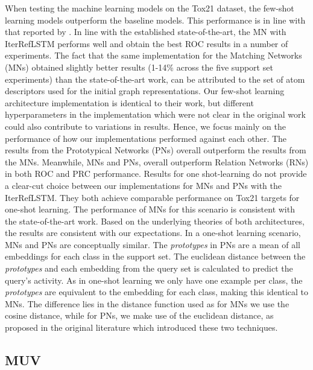 \documentclass[journal=acscii,manuscript=article]{achemso}
\begin{document}
When testing the machine learning models on the Tox21 dataset, the few-shot learning models outperform the baseline models. This performance is in line with that reported by \citet{altae2017low}. In line with the established state-of-the-art, the MN with IterRefLSTM performs well and obtain the best ROC results in a number of experiments. The fact that the same implementation for the Matching Networks (MNs) obtained slightly better results (1-14\% across the five support set experiments) than the state-of-the-art work, can be attributed to the set of atom descriptors used for the initial graph representations. Our few-shot learning architecture implementation is identical to their work, but different hyperparameters in the implementation which were not clear in the original work could also contribute to variations in results. Hence, we focus mainly on the performance of how our implementations performed against each other. The results from the Prototypical Networks (PNs) overall outperform the results from the MNs. Meanwhile, MNs and PNs, overall outperform Relation Networks (RNs) in both ROC and PRC performance. Results for one shot-learning do not provide a clear-cut choice between our implementations for MNs and PNs with the IterRefLSTM. They both achieve comparable performance on Tox21 targets for one-shot learning. The performance of MNs for this scenario is consistent with the state-of-the-art work. Based on the underlying theories of both architectures, the results are consistent with our expectations. In a one-shot learning scenario, MNs and PNs are conceptually similar. The \textit{prototypes} in PNs are a mean of all embeddings for each class in the support set. The euclidean distance between the \textit{prototypes} and each embedding from the query set is calculated to predict the query's activity. As in one-shot learning we only have one example per class, the \textit{prototypes} are equivalent to the embedding for each class, making this identical to MNs. The difference lies in the distance function used as for MNs we use the cosine distance, while for PNs, we make use of the euclidean distance, as proposed in the original literature which introduced these two techniques.


\subsection{MUV}
\end{document}
